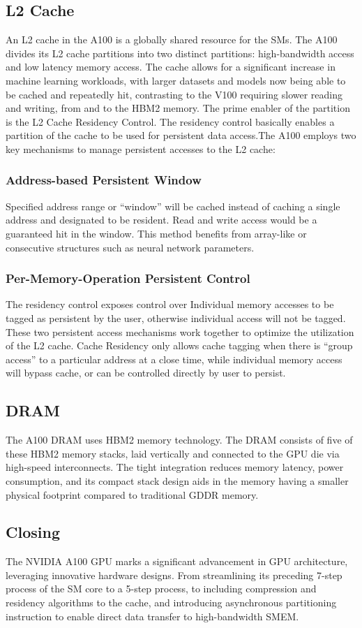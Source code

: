 \subsection{L2 Cache}
\label{subsec:l2-cache}
An L2 cache in the A100 is a globally shared resource for the SMs.
The A100 divides its L2 cache partitions into two distinct partitions: high-bandwidth access and low latency memory access.
The cache allows for a significant increase in machine learning workloads, with larger datasets and models now being able to be cached and repeatedly hit, contrasting to the V100 requiring slower reading and writing, from and to the HBM2 memory.
The prime enabler of the partition is the L2 Cache Residency Control.
The residency control basically enables a partition of the cache to be used for persistent data access.The A100 employs two key mechanisms to manage persistent accesses to the L2 cache:

\subsubsection{Address-based Persistent Window} Specified address range or “window” will be cached instead of caching a single address and designated to be resident.
Read and write access would be a guaranteed hit in the window.
This method benefits from array-like or consecutive structures such as neural network parameters.

\subsubsection{Per-Memory-Operation Persistent Control} The residency control exposes control over Individual memory accesses to be tagged as persistent by the user, otherwise individual access will not be tagged.
These two persistent access mechanisms work together to optimize the utilization of the L2 cache.
Cache Residency only allows cache tagging when there is ``group access'' to a particular address at a close time, while individual memory access will bypass cache, or can be controlled directly by user to persist.

\subsection{DRAM}
\label{subsec:dram}
The A100 DRAM uses HBM2 memory technology.
The DRAM consists of five of these HBM2 memory stacks, laid vertically and connected to the GPU die via high-speed interconnects.
The tight integration reduces memory latency, power consumption, and its compact stack design aids in the memory having a smaller physical footprint compared to traditional GDDR memory.

\subsection{Closing}
\label{subsec:closing}
The NVIDIA A100 GPU marks a significant advancement in GPU architecture, leveraging innovative hardware designs.
From streamlining its preceding 7-step process of the SM core to a 5-step process, to including compression and residency algorithms to the cache, and introducing asynchronous partitioning instruction to enable direct data transfer to high-bandwidth SMEM\@.